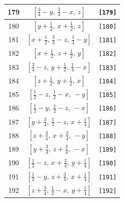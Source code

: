 \documentclass[fleqn,8pt]{jsarticle}
\begin{document}
\begin{longtable}{ccc}
179 & $\left[ \frac{3}{4} - y,\, \frac{3}{4} - x,\, z \right]$ & {\tt [179]} \\ \hline
180 & $\left[ y + \frac{1}{2},\, x + \frac{1}{2},\, z \right]$ & {\tt [180]} \\ \hline
181 & $\left[ x + \frac{1}{2},\, \frac{3}{4} - z,\, \frac{1}{4} - y \right]$ & {\tt [181]} \\ \hline
182 & $\left[ x + \frac{1}{2},\, z + \frac{1}{2},\, y \right]$ & {\tt [182]} \\ \hline
183 & $\left[ \frac{3}{4} - z,\, y + \frac{1}{2},\, \frac{1}{4} - x \right]$ & {\tt [183]} \\ \hline
184 & $\left[ z + \frac{1}{2},\, y + \frac{1}{2},\, x \right]$ & {\tt [184]} \\ \hline
185 & $\left[ \frac{1}{2} - z,\, \frac{1}{2} - x,\, - y \right]$ & {\tt [185]} \\ \hline
186 & $\left[ \frac{1}{2} - y,\, \frac{1}{2} - z,\, - x \right]$ & {\tt [186]} \\ \hline
187 & $\left[ y + \frac{3}{4},\, \frac{1}{2} - z,\, x + \frac{1}{4} \right]$ & {\tt [187]} \\ \hline
188 & $\left[ z + \frac{3}{4},\, x + \frac{3}{4},\, - y \right]$ & {\tt [188]} \\ \hline
189 & $\left[ y + \frac{3}{4},\, z + \frac{3}{4},\, - x \right]$ & {\tt [189]} \\ \hline
190 & $\left[ \frac{1}{2} - z,\, x + \frac{3}{4},\, y + \frac{1}{4} \right]$ & {\tt [190]} \\ \hline
191 & $\left[ \frac{1}{2} - y,\, z + \frac{3}{4},\, x + \frac{1}{4} \right]$ & {\tt [191]} \\ \hline
192 & $\left[ z + \frac{3}{4},\, \frac{1}{2} - x,\, y + \frac{1}{4} \right]$ & {\tt [192]} \\
\end{longtable}
\end{document}
